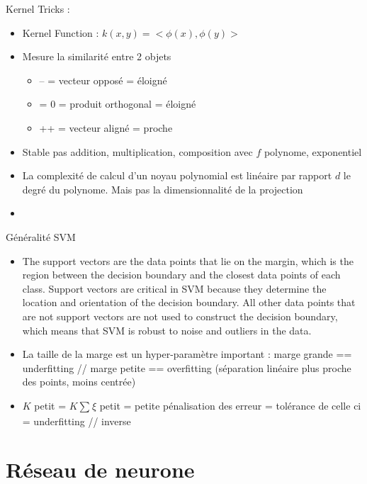 \documentclass{article}
\theoremstyle{plain}%
\theoremstyle{definition}
\theoremstyle{remark}
\begin{document}
Kernel Tricks : 
\begin{itemize}
    \item Kernel Function : $ k(x,y) = <\phi (x), \phi(y)> $
    \item Mesure la similarité entre 2 objets \begin{itemize}
        \item -- = vecteur opposé = éloigné
        \item = 0 = produit orthogonal = éloigné 
        \item ++ = vecteur aligné = proche
    \end{itemize}
    \item Stable pas addition, multiplication, composition avec $ f $ polynome, exponentiel
    \item La complexité de calcul d'un noyau polynomial est linéaire par rapport $d$ le degré du polynome. Mais pas la dimensionnalité de la projection
    \item 
\end{itemize}

Généralité SVM 
\begin{itemize}
    \item The support vectors are the data points that lie on the margin, which is the region between the decision boundary and the closest data points of each class. Support vectors are critical in SVM because they determine the location and orientation of the decision boundary. All other data points that are not support vectors are not used to construct the decision boundary, which means that SVM is robust to noise and outliers in the data.
    \item La taille de la marge est un hyper-paramètre important : marge grande == underfitting // marge petite == overfitting (séparation linéaire plus proche des points, moins centrée)
    \item $ K $ petit = $ K \sum_{}^{}\xi  $ petit = petite pénalisation des erreur = tolérance de celle ci = underfitting // inverse
\end{itemize}

\section{Réseau de neurone}
\end{document}

